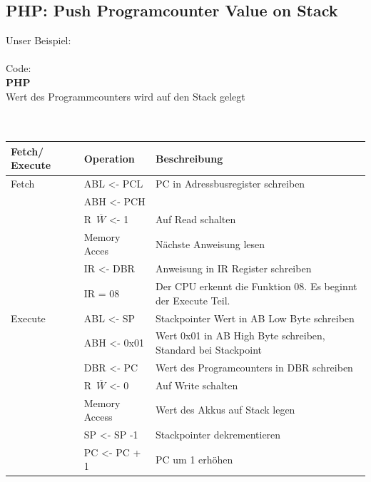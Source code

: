 \documentclass[a4paper,10pt]{report}
\begin{document}
\subsection{PHP: Push Programcounter Value on Stack}
Unser Beispiel: \\
\\
Code:\\
\textbf{PHP}
\\
Wert des Programmcounters wird auf den Stack gelegt\\
\\
\\
\begin{tabularx}{\textwidth}{l|l|X}
Fetch/ Execute & Operation & Beschreibung \\ \hline 
Fetch& ABL <- PCL& PC in Adressbusregister schreiben\\
& ABH <- PCH& \\
&R\ $\overline{W}$ <- 1& Auf Read schalten\\
&Memory Acces& Nächste Anweisung lesen\\
&IR <- DBR& Anweisung in IR Register schreiben\\
&IR = 08 & Der CPU erkennt die Funktion 08. Es beginnt der Execute Teil.\\
Execute&ABL <- SP& Stackpointer Wert in AB Low Byte schreiben\\
&ABH <- 0x01& Wert 0x01 in AB High Byte schreiben, Standard bei Stackpoint\\
&DBR <- PC& Wert des Programcounters in DBR schreiben\\
&R\ $\overline{W}$ <- 0& Auf Write schalten\\
&Memory Access&  Wert des Akkus auf Stack legen\\
&SP <- SP -1& Stackpointer dekrementieren\\
&PC <- PC + 1& PC um 1 erhöhen\\
\end{tabularx}
\end{document}
